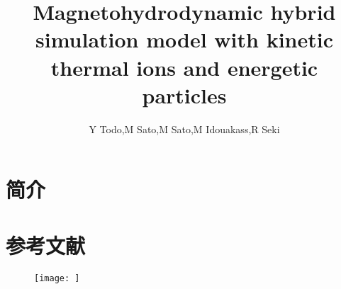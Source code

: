 \documentclass[oneside,onecolumn]{article}
\title{Magnetohydrodynamic hybrid simulation model with kinetic thermal ions and energetic particles}
\author{Y Todo,M Sato,M Sato,M Idouakass,R Seki}
\date{} %
\begin{document}
	\begin{sloppypar}
		\maketitle
		
\section{简介}
		
\section{参考文献}

\begin{figure}[htbp]
	\centering
	\texttt{[image: ]}
	\caption{}
	\label{fig1}
\end{figure}

\begin{equation}
	
\end{equation}
\end{sloppypar}	
\end{document}
